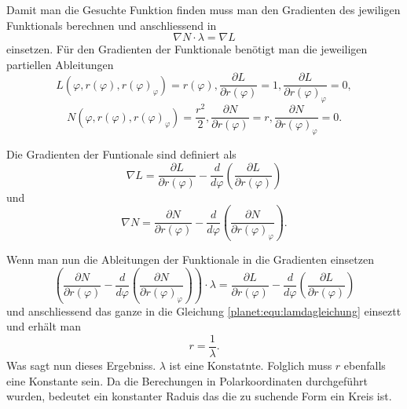 Damit man die Gesuchte Funktion finden muss man den Gradienten des jewiligen Funktionals berechnen und anschliessend in
\begin{equation}
	\nabla N \cdot \lambda = \nabla L
	\label{planet:equ:lamdagleichung}
\end{equation}
einsetzen.
Für den Gradienten der Funktionale benötigt man die jeweiligen partiellen Ableitungen
\begin{equation*}
	L(\varphi ,r(\varphi),r(\varphi)_\varphi) = r(\varphi),
	\frac{\partial L}{\partial r(\varphi)} = 1,
	\frac{\partial L}{\partial r(\varphi)_\varphi} = 0,
\end{equation*}
\begin{equation*}
	N(\varphi ,r(\varphi),r(\varphi)_\varphi) = \frac{r^2}{2} ,
	\frac{\partial N}{\partial r(\varphi)} = r,
	\frac{\partial N}{\partial r(\varphi)_\varphi} = 0.
\end{equation*}

Die Gradienten der Funtionale sind definiert als 
\begin{equation*}
	\nabla L = 
	\frac{\partial L}{\partial r(\varphi)}-  \frac{d}{d\varphi}\left( \frac{\partial L}{\partial r(\varphi)} \right)
\end{equation*}
und
\begin{equation*}
	\nabla N = \frac{\partial N}{\partial r(\varphi)} - \frac{d}{d\varphi}\left(\frac{\partial N}{\partial r(\varphi)_\varphi}\right).
\end{equation*}

Wenn man nun die Ableitungen der Funktionale in die Gradienten einsetzen
\begin{equation*}
	\left(\frac{\partial N}{\partial r(\varphi)} - \frac{d}{d\varphi}\left(\frac{\partial N}{\partial r(\varphi)_\varphi}\right)\right)\cdot \lambda = \frac{\partial L}{\partial r(\varphi)}-  \frac{d}{d\varphi}\left( \frac{\partial L}{\partial r(\varphi)} \right)
\end{equation*} 
und anschliessend das ganze in die Gleichung \ref{planet:equ:lamdagleichung}
einseztt und erhält man
\begin{equation*}
	r = \frac{1}{\lambda}.
\end{equation*}
Was sagt nun dieses Ergebniss.
\(\lambda\) ist eine Konstatnte.
Folglich muss \(r\) ebenfalls eine Konstante sein.
Da die Berechungen in Polarkoordinaten durchgeführt wurden, bedeutet ein konstanter Raduis das die zu suchende Form ein Kreis ist.

